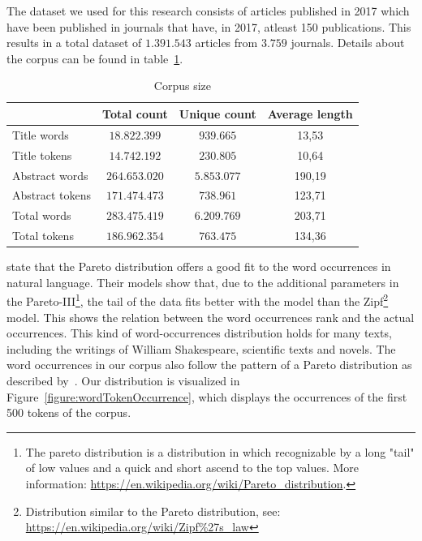 \documentclass[../../Thesis.tex]{subfiles}
\begin{document}
The dataset we used for this research consists of articles published in 2017 which have been published in journals that have, in 2017, atleast 150 publications. This results in a total dataset of $1.391.543$ articles from $3.759$ journals. Details about the corpus can be found in table~\ref{table:corpusSize}.
\begin{table}[hbt]
\begin{center}
\begin{tabular}{|l|c|c|c|}
\hline
 & Total count & Unique count & Average length \\
\hline\hline
Title words & $18.822.399$ & $939.665$ & 13,53  \\
\hline
Title tokens & $14.742.192$ & $230.805$ & 10,64 \\
\hline\hline
Abstract words & $264.653.020$ & $5.853.077$  & 190,19  \\
\hline
Abstract tokens & $171.474.473$ & $738.961$ & 123,71 \\
\hline\hline
Total words & $283.475.419$ & $6.209.769$  & 203,71 \\
\hline
Total tokens & $186.962.354$ & $763.475$ & 134,36 \\
\hline
\end{tabular}
\end{center}
\caption{Corpus size}\label{table:corpusSize}
\end{table}
\clearpage
{}
\citet{wiegand2018word} state that the Pareto distribution offers a good fit to the word occurrences in natural language. Their models show that, due to the additional parameters in the Pareto-III\footnote{The pareto distribution is a distribution in which recognizable by a long "tail" of low values and a quick and short ascend to the top values. More information: \url{https://en.wikipedia.org/wiki/Pareto_distribution}.}, the tail of the data fits better with the model than the Zipf\footnote{Distribution similar to the Pareto distribution, see: \url{https://en.wikipedia.org/wiki/Zipf\%27s_law}} model. This shows the relation between the word occurrences rank and the actual occurrences. This kind of word-occurrences distribution holds for many texts, including the writings of William Shakespeare, scientific texts and novels\cite{thurner2015understanding}.
The word occurrences in our corpus also follow the pattern of a Pareto distribution as described by~\citet{wiegand2018word}. Our distribution is visualized in Figure~\ref{figure:wordTokenOccurrence}, which displays the occurrences of the first 500 tokens of the corpus.
\end{document}
